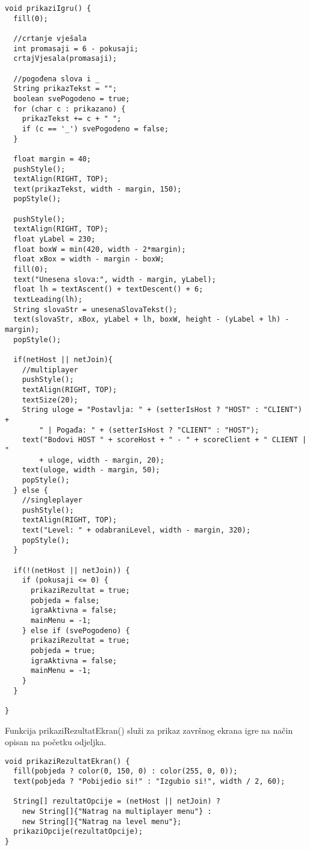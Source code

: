 \documentclass{article}
\begin{document}
\begin{verbatim}
void prikaziIgru() {
  fill(0);

  //crtanje vješala
  int promasaji = 6 - pokusaji;
  crtajVjesala(promasaji);

  //pogođena slova i _
  String prikazTekst = "";
  boolean svePogodeno = true;
  for (char c : prikazano) {
    prikazTekst += c + " ";
    if (c == '_') svePogodeno = false;
  }
  
  float margin = 40;
  pushStyle();
  textAlign(RIGHT, TOP);
  text(prikazTekst, width - margin, 150);
  popStyle();

  pushStyle();
  textAlign(RIGHT, TOP);
  float yLabel = 230;
  float boxW = min(420, width - 2*margin);
  float xBox = width - margin - boxW;
  fill(0);
  text("Unesena slova:", width - margin, yLabel);
  float lh = textAscent() + textDescent() + 6;
  textLeading(lh);
  String slovaStr = unesenaSlovaTekst();
  text(slovaStr, xBox, yLabel + lh, boxW, height - (yLabel + lh) - margin);
  popStyle();

  if(netHost || netJoin){
    //multiplayer
    pushStyle();
    textAlign(RIGHT, TOP);
    textSize(20);
    String uloge = "Postavlja: " + (setterIsHost ? "HOST" : "CLIENT") + 
        " | Pogađa: " + (setterIsHost ? "CLIENT" : "HOST");
    text("Bodovi HOST " + scoreHost + " - " + scoreClient + " CLIENT | " 
        + uloge, width - margin, 20);
    text(uloge, width - margin, 50);
    popStyle();
  } else {
    //singleplayer
    pushStyle();
    textAlign(RIGHT, TOP);
    text("Level: " + odabraniLevel, width - margin, 320);
    popStyle();
  }

  if(!(netHost || netJoin)) {
    if (pokusaji <= 0) {
      prikaziRezultat = true;
      pobjeda = false;
      igraAktivna = false;
      mainMenu = -1;
    } else if (svePogodeno) {
      prikaziRezultat = true;
      pobjeda = true;
      igraAktivna = false;
      mainMenu = -1;
    }
  }
  
}
\end{verbatim}

Funkcija prikaziRezultatEkran() služi za prikaz završnog ekrana igre na način opisan na početku odjeljka. 

\begin{verbatim}
void prikaziRezultatEkran() {
  fill(pobjeda ? color(0, 150, 0) : color(255, 0, 0));
  text(pobjeda ? "Pobijedio si!" : "Izgubio si!", width / 2, 60);

  String[] rezultatOpcije = (netHost || netJoin) ? 
    new String[]{"Natrag na multiplayer menu"} : 
    new String[]{"Natrag na level menu"};
  prikaziOpcije(rezultatOpcije);
}
\end{verbatim}
\end{document}
